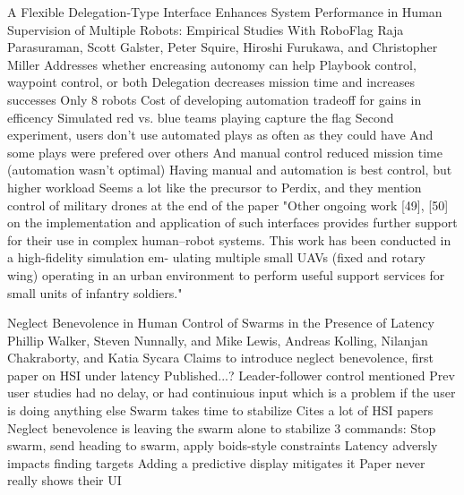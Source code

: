 \citep{parasuraman2005flexible}
A Flexible Delegation-Type Interface Enhances System Performance in Human Supervision of Multiple Robots: Empirical Studies With RoboFlag
Raja Parasuraman, Scott Galster, Peter Squire, Hiroshi Furukawa, and Christopher Miller
	Addresses whether encreasing autonomy can help
	Playbook control, waypoint control, or both
	Delegation decreases mission time and increases successes
	Only 8 robots
	Cost of developing automation tradeoff for gains in efficency
	Simulated red vs. blue teams playing capture the flag
	Second experiment, users don't use automated plays as often as they could have
		And some plays were prefered over others
		And manual control reduced mission time (automation wasn't optimal)
		Having manual and automation is best control, but higher workload
	Seems a lot like the precursor to Perdix, and they mention control of military drones at the end of the paper "Other ongoing work [49], [50] on
the implementation and application of such interfaces provides
further support for their use in complex human–robot systems.
This work has been conducted in a high-fidelity simulation em-
ulating multiple small UAVs (fixed and rotary wing) operating
in an urban environment to perform useful support services for
small units of infantry soldiers."

\citep{walker2012neglect}
Neglect Benevolence in Human Control of Swarms in the Presence of Latency
Phillip Walker, Steven Nunnally, and Mike Lewis, Andreas Kolling, Nilanjan Chakraborty, and Katia Sycara 
	Claims to introduce neglect benevolence, first paper on HSI under latency
		Published...?
	Leader-follower control mentioned
	Prev user studies had no delay, or had continuious input
		which is a problem if the user is doing anything else
	Swarm takes time to stabilize
		Cites a lot of HSI papers
		Neglect benevolence is leaving the swarm alone to stabilize
	3 commands: Stop swarm, send heading to swarm, apply boids-style constraints
	Latency adversly impacts finding targets
	Adding a predictive display mitigates it
	Paper never really shows their UI


